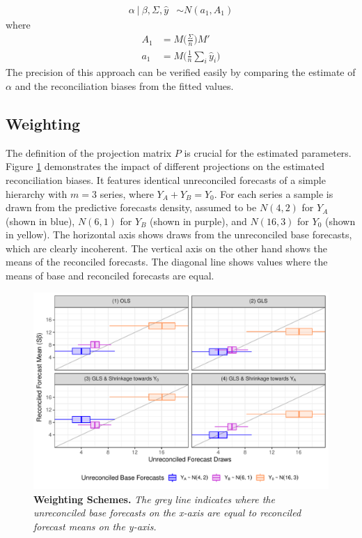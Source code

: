 \documentclass[a4paper,fleqn,11pt]{article}
\begin{document}
\begin{align}
	\label{eq:alpha}
	\alpha\ |\ \beta,\Sigma,\hat{y} &\sim N(a_1,A_1)
\end{align}
where
\begin{align*}
	A_1 &= M\Bigg(\frac{\Sigma}{n}\Bigg)M'\\
	a_1 &= M\Bigg(\frac{1}{n}\sum_i \hat{y}_i\Bigg) 
\end{align*}
The precision of this approach can be verified easily by comparing the estimate of $\alpha$ and the reconciliation biases from the fitted values. \\


\subsection{Weighting}
\label{sec:weighting}
The definition of the projection matrix $P$ is crucial for the estimated parameters. Figure \ref{fig:weights} demonstrates the impact of different projections on the estimated reconciliation biases. It features identical unreconciled forecasts of a simple hierarchy with $m=3$ series, where $Y_A + Y_B = Y_0$. For each series a sample is drawn from the predictive forecasts density, assumed to be $N(4,2)$ for $Y_A$ (shown in blue), $N(6,1)$ for $Y_B$ (shown in purple), and $N(16,3)$ for $Y_0$ (shown in yellow). The horizontal axis shows draws from the unreconciled base forecasts, which are clearly incoherent. The vertical axis on the other hand shows the means of the reconciled forecasts. The diagonal line shows values where the means of base and reconciled forecasts are equal.
\begin{figure}[H]
	\includegraphics[width=\textwidth]{fig/fig_biases}
	\caption[Weighting Schemes]{\textbf{Weighting Schemes.} \textit{The grey line indicates where the unreconciled base forecasts on the x-axis are equal to reconciled forecast means on the y-axis.}}\label{fig:weights}
\end{figure}
\end{document}
